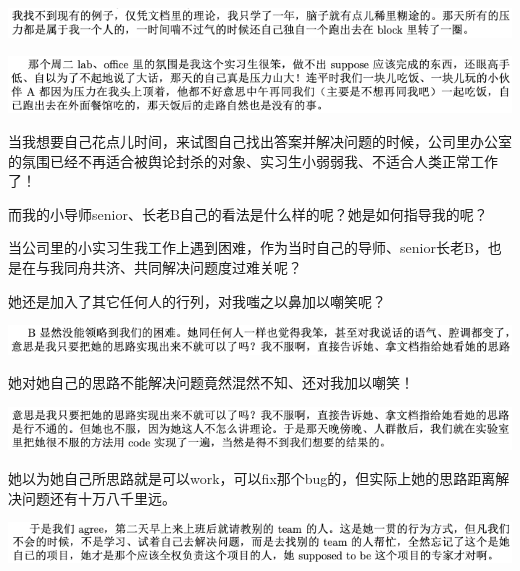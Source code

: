 \documentclass[9pt, b5paper]{article}
\begin{document}
\begin{center}
\includegraphics[width=.9\linewidth]{./pic/backups_plans_20210507_131017.png}
\end{center}

\begin{center}
\includegraphics[width=.9\linewidth]{./pic/backups_plans_20210507_124145.png}
\end{center}

当我想要自己花点儿时间，来试图自己找出答案并解决问题的时候，公司里办公室的氛围已经不再适合被舆论封杀的对象、实习生小弱弱我、不适合人类正常工作了！

而我的小导师senior、长老B自己的看法是什么样的呢？她是如何指导我的呢？

当公司里的小实习生我工作上遇到困难，作为当时自己的导师、senior长老B，也是在与我同舟共济、共同解决问题度过难关呢？

她还是加入了其它任何人的行列，对我嗤之以鼻加以嘲笑呢？

\begin{center}
\includegraphics[width=.9\linewidth]{./pic/backups_plans_20210507_131425.png}
\end{center}

她对她自己的思路不能解决问题竟然混然不知、还对我加以嘲笑！

\begin{center}
\includegraphics[width=.9\linewidth]{./pic/backups_plans_20210507_131548.png}
\end{center}

她以为她自己所思路就是可以work，可以fix那个bug的，但实际上她的思路距离解决问题还有十万八千里远。 

\begin{center}
\includegraphics[width=.9\linewidth]{./pic/backups_plans_20210507_124747.png}
\end{center}
\end{document}
